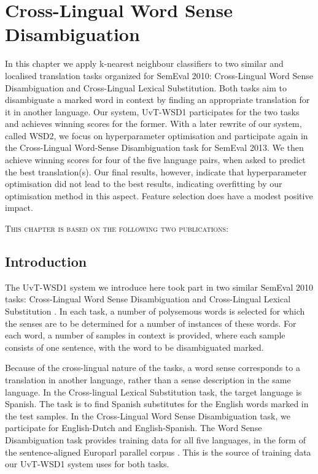 \chapter{Cross-Lingual Word Sense Disambiguation}
\label{chap:clwsd}



In this chapter we apply k-nearest neighbour classifiers to two similar and
localised translation tasks organized for SemEval 2010: Cross-Lingual Word
Sense Disambiguation and Cross-Lingual Lexical Substitution.  Both tasks aim to
disambiguate a marked word in context by finding an appropriate translation for
it in another language. Our system, UvT-WSD1 participates for the two tasks and
achieves winning scores for the former. With a later rewrite of our system,
called WSD2, we focus on hyperparameter optimisation and participate again in
the Cross-Lingual Word-Sense Disambiguation task for SemEval 2013. We then
achieve winning scores for four of the five language pairs, when asked to
predict the best translation(s). Our final results, however, indicate that
hyperparameter optimisation did not lead to the best results, indicating
overfitting by our optimisation method in this aspect. Feature selection does
have a modest positive impact.


\nobibliography*
\textsc{This chapter is based on the following two publications: }
\begin{NoHyper}
\end{NoHyper}




\section{Introduction}

The UvT-WSD1 system we introduce here took part in two similar SemEval 2010
tasks: Cross-Lingual Word Sense Disambiguation \citep{WSD} and Cross-Lingual
Lexical Substitution \citep{CLLS}. In each task, a number of polysemous words is
selected for which the senses are to be determined for a number of instances of
these words. For each word, a number of samples in context is provided, where
each sample consists of one sentence, with the word to be disambiguated marked.

Because of the cross-lingual nature of the tasks, a word sense corresponds to a
translation in another language, rather than a sense description in the same
language. In the Cross-lingual Lexical Substitution task, the target language
is Spanish. The task is to find Spanish substitutes for the English words
marked in the test samples. In the Cross-Lingual Word Sense Disambiguation
task, we participate for English-Dutch and English-Spanish. The Word Sense
Disambiguation task provides training data for all five languages, in the form
of the sentence-aligned Europarl parallel corpus \citep{EUROPARL}. This is the
source of training data our UvT-WSD1 system uses for both tasks.

